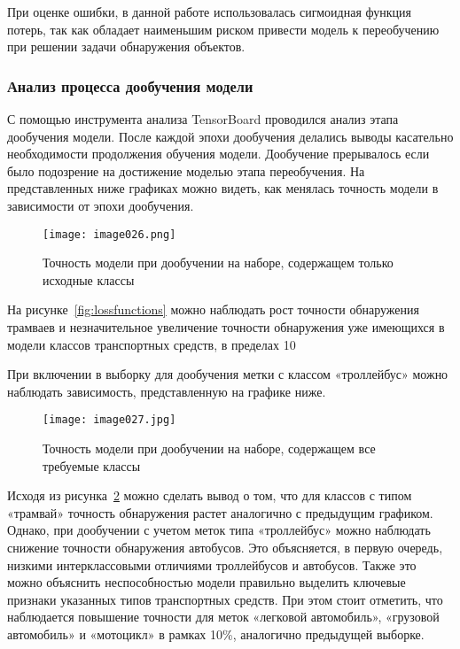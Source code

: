 При оценке ошибки, в данной работе использовалась сигмоидная функция потерь, так как обладает наименьшим риском привести модель к переобучению при решении задачи обнаружения объектов. 

\subsubsection{Анализ процесса дообучения модели}

С помощью инструмента анализа TensorBoard проводился анализ этапа дообучения модели. После каждой эпохи дообучения делались выводы касательно необходимости продолжения обучения модели. Дообучение прерывалось если было подозрение на достижение моделью этапа переобучения. На представленных ниже графиках можно видеть, как менялась точность модели в зависимости от эпохи дообучения.

\begin{figure}[htbp]
\centering
\texttt{[image: image026.png]}
\caption{Точность модели при дообучении на наборе, содержащем только исходные классы}%
\label{fig:empty}
\end{figure}

На рисунке~\ref{fig:lossfunctions} можно наблюдать рост точности обнаружения трамваев и незначительное увеличение точности обнаружения уже имеющихся в модели классов транспортных средств, в пределах 10%

При включении в выборку для дообучения метки с классом «троллейбус» можно наблюдать зависимость, представленную на графике ниже.

\begin{figure}[htbp]
\centering
\texttt{[image: image027.jpg]}
\caption{Точность модели при дообучении на наборе, содержащем все требуемые классы}%
\label{fig:image027}
\end{figure}

Исходя из рисунка~\ref{fig:image027} можно сделать вывод о том, что для классов с типом «трамвай» точность обнаружения растет аналогично с предыдущим графиком. Однако, при дообучении с учетом меток типа «троллейбус» можно наблюдать снижение точности обнаружения автобусов. Это объясняется, в первую очередь, низкими интерклассовыми отличиями троллейбусов и автобусов. Также это можно объяснить неспособностью модели правильно выделить ключевые признаки указанных типов транспортных средств. При этом стоит отметить, что наблюдается повышение точности для меток «легковой автомобиль», «грузовой автомобиль» и «мотоцикл» в рамках 10\%, аналогично предыдущей выборке. 

